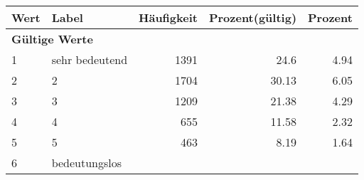     \begin{longtable}{lXrrr}
     \toprule
     \textbf{Wert} & \textbf{Label} & \textbf{Häufigkeit} & \textbf{Prozent(gültig)} & \textbf{Prozent} \\
     \endhead
     \midrule
     \multicolumn{5}{l}{\textbf{Gültige Werte}}\\

     1 &
     \multicolumn{1}{X}{ sehr bedeutend   } &


       \num{1391} &
       \num[round-mode=places,round-precision=2]{24.6} &
         \num[round-mode=places,round-precision=2]{4.94} \\

     2 &
     \multicolumn{1}{X}{ 2   } &


       \num{1704} &
       \num[round-mode=places,round-precision=2]{30.13} &
         \num[round-mode=places,round-precision=2]{6.05} \\

     3 &
     \multicolumn{1}{X}{ 3   } &


       \num{1209} &
       \num[round-mode=places,round-precision=2]{21.38} &
         \num[round-mode=places,round-precision=2]{4.29} \\

     4 &
     \multicolumn{1}{X}{ 4   } &


       \num{655} &
       \num[round-mode=places,round-precision=2]{11.58} &
         \num[round-mode=places,round-precision=2]{2.32} \\

     5 &
     \multicolumn{1}{X}{ 5   } &


       \num{463} &
       \num[round-mode=places,round-precision=2]{8.19} &
         \num[round-mode=places,round-precision=2]{1.64} \\

     6 &
     \multicolumn{1}{X}{ bedeutungslos   } &



\end{longtable}
